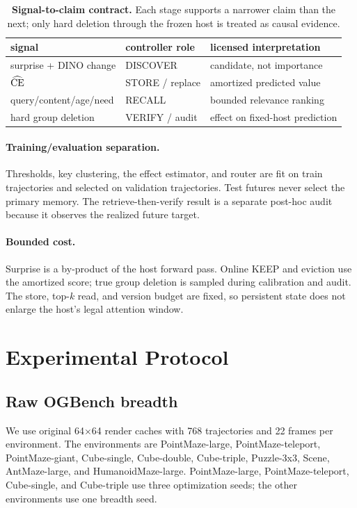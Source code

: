 \begin{table}[t]
\centering\footnotesize
\caption{\textbf{Signal-to-claim contract.} Each stage supports a narrower
claim than the next; only hard deletion through the frozen host is treated as
causal evidence.}
\label{tab:signal-contract}
\begin{tabularx}{\linewidth}{lYY}
\toprule
signal & controller role & licensed interpretation\\
\midrule
surprise + DINO change & DISCOVER & candidate, not importance\\
$\widehat{\operatorname{CE}}$ & STORE / replace & amortized predicted value\\
query/content/age/need & RECALL & bounded relevance ranking\\
hard group deletion & VERIFY / audit & effect on fixed-host prediction\\
\bottomrule
\end{tabularx}
\end{table}

\paragraph{Training/evaluation separation.}
Thresholds, key clustering, the effect estimator, and router are fit on train
trajectories and selected on validation trajectories. Test futures never
select the primary memory. The retrieve-then-verify result is a separate
post-hoc audit because it observes the realized future target.

\paragraph{Bounded cost.}
Surprise is a by-product of the host forward pass. Online KEEP and eviction use
the amortized score; true group deletion is sampled during calibration and
audit. The store, top-$k$ read, and version budget are fixed, so persistent
state does not enlarge the host's legal attention window.

\section{Experimental Protocol}
\label{sec:protocol}

\subsection{Raw OGBench breadth}

We use original 64$\times$64 render caches with 768 trajectories and 22 frames
per environment. The environments are PointMaze-large, PointMaze-teleport,
PointMaze-giant, Cube-single, Cube-double, Cube-triple, Puzzle-3x3, Scene,
AntMaze-large, and HumanoidMaze-large. PointMaze-large, PointMaze-teleport,
Cube-single, and Cube-triple use three optimization seeds; the other
environments use one breadth seed.

